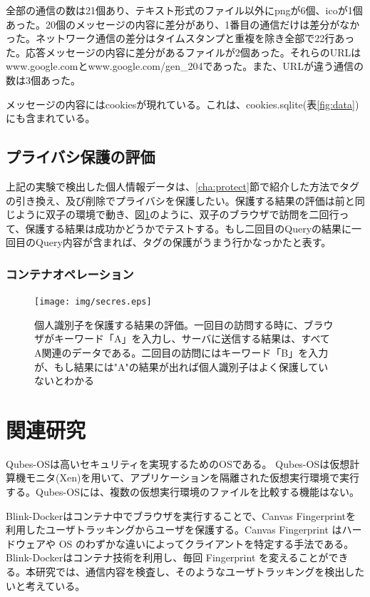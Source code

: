 \documentclass[a4paper,twocolumn,10pt]{jarticle}
\begin{document}
全部の通信の数は21個あり、テキスト形式のファイル以外にpngが6個、icoが1個あった。20個のメッセージの内容に差分があり、1番目の通信だけは差分がなかった。ネットワーク通信の差分はタイムスタンプと重複を除き全部で22行あった。応答メッセージの内容に差分があるファイルが2個あった。それらのURLはwww.google.comとwww.google.com/gen\_204であった。また、URLが違う通信の数は3個あった。

メッセージの内容にはcookiesが現れている。これは、cookies.sqlite(表\ref{fig:data})にも含まれている。



\subsection{プライバシ保護の評価}

上記の実験で検出した個人情報データは、\ref{cha:protect}節で紹介した方法でタグの引き換え、及び削除でプライバシを保護したい。保護する結果の評価は前と同じように双子の環境で動き、図\ref{figure:secres}のように、双子のブラウザで訪問を二回行って、保護する結果は成功かどうかでテストする。もし二回目のQueryの結果に一回目のQuery内容が含まれば、タグの保護がうまう行かなっかたと表す。

\subsubsection{コンテナオペレーション}


\begin{figure}[ht]
\begin{center}
\texttt{[image: img/secres.eps]}
\caption{個人識別子を保護する結果の評価。一回目の訪問する時に、ブラウザがキーワード「A」を入力し、サーバに送信する結果は、すべてA関連のデータである。二回目の訪問にはキーワード「B」を入力が、もし結果には"A"の結果が出れば個人識別子はよく保護していないとわかる}
\label{figure:secres}
\end{center}
\end{figure}


\section{関連研究}
Qubes-OS\cite{qubes}は高いセキュリティを実現するためのOSである。 Qubes-OSは仮想計算機モニタ(Xen)を用いて、アプリケーションを隔離された仮想実行環境で実行する。Qubes-OSには、複数の仮想実行環境のファイルを比較する機能はない。

Blink-Docker\cite{blink}はコンテナ中でブラウザを実行することで、Canvas Fingerprintを利用したユーザトラッキングからユーザを保護する。Canvas Fingerprint はハードウェアや OS のわずかな違いによってクライアントを特定する手法である。Blink-Dockerはコンテナ技術を利用し、毎回 Fingerprint を変えることができる。本研究では、通信内容を検査し、そのようなユーザトラッキングを検出したいと考えている。
\end{document}
